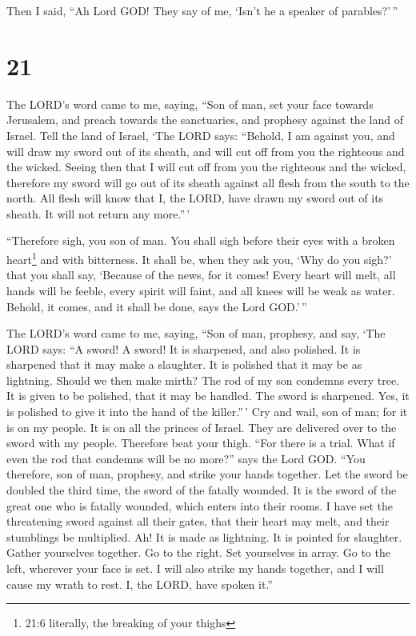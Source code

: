  Then I said, ``Ah Lord GOD! They say of me, `Isn't he a
speaker of parables?'\,''

\hypertarget{section-19}{%
\section{21}\label{section-19}}

 The LORD's word came to me, saying,  ``Son of
man, set your face towards Jerusalem, and preach towards the
sanctuaries, and prophesy against the land of Israel.  Tell
the land of Israel, `The LORD says: ``Behold, I am against you, and will
draw my sword out of its sheath, and will cut off from you the righteous
and the wicked.  Seeing then that I will cut off from you
the righteous and the wicked, therefore my sword will go out of its
sheath against all flesh from the south to the north.  All
flesh will know that I, the LORD, have drawn my sword out of its sheath.
It will not return any more.''\,'

 ``Therefore sigh, you son of man. You shall sigh before
their eyes with a broken heart\footnote{21:6 literally, the breaking of
  your thighs} and with bitterness.  It shall be, when they
ask you, `Why do you sigh?' that you shall say, `Because of the news,
for it comes! Every heart will melt, all hands will be feeble, every
spirit will faint, and all knees will be weak as water. Behold, it
comes, and it shall be done, says the Lord GOD.'\,''

 The LORD's word came to me, saying,  ``Son of
man, prophesy, and say, `The LORD says: ``A sword! A sword! It is
sharpened, and also polished.  It is sharpened that it may
make a slaughter. It is polished that it may be as lightning. Should we
then make mirth? The rod of my son condemns every tree.  It
is given to be polished, that it may be handled. The sword is sharpened.
Yes, it is polished to give it into the hand of the killer.''\,'
 Cry and wail, son of man; for it is on my people. It is on
all the princes of Israel. They are delivered over to the sword with my
people. Therefore beat your thigh.  ``For there is a trial.
What if even the rod that condemns will be no more?'' says the Lord GOD.
 ``You therefore, son of man, prophesy, and strike your
hands together. Let the sword be doubled the third time, the sword of
the fatally wounded. It is the sword of the great one who is fatally
wounded, which enters into their rooms.  I have set the
threatening sword against all their gates, that their heart may melt,
and their stumblings be multiplied. Ah! It is made as lightning. It is
pointed for slaughter.  Gather yourselves together. Go to
the right. Set yourselves in array. Go to the left, wherever your face
is set.  I will also strike my hands together, and I will
cause my wrath to rest. I, the LORD, have spoken it.''

